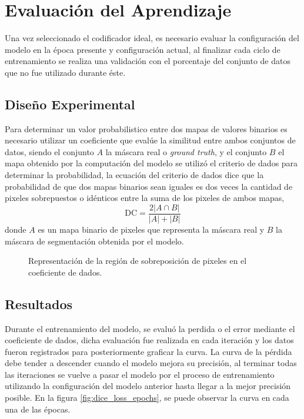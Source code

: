 \clearpage

\section{Evaluación del Aprendizaje}
Una vez seleccionado el codificador ideal, es necesario evaluar la configuración del modelo en la época presente y configuración actual, al finalizar cada ciclo de entrenamiento se realiza una validación con el porcentaje del conjunto de datos que no fue utilizado durante éste.
\subsection{Diseño Experimental}
Para determinar un valor probabilistico entre dos mapas de valores binarios es necesario utilizar un coeficiente que evalúe la similitud entre ambos conjuntos de datos, siendo el conjunto $A$ la máscara real o \emph{ground truth}, y el conjunto $B$ el mapa obtenido por la computación del modelo se utilizó el criterio de dados para determinar la probabilidad, la ecuación del criterio de dados dice que la probabilidad de que dos mapas binarios sean iguales es dos veces la cantidad de pixeles sobrepuestos o idénticos entre la suma de los pixeles de ambos mapas, 
\begin{equation}\label{eq:diceloss}
    \text{DC} = \frac{2|A \cap B |}{|A| + |B|}
\end{equation}
donde $A$ es un mapa binario de pixeles que representa la máscara real y $B$ la máscara de segmentación obtenida por el modelo.

\def\firstcircle{(0,0) circle (1.5cm)}
\def\secondcircle{(2,0) circle (1.5cm)}
\def\thirdcircle{(0:2cm) circle (1.5cm)}

\begin{figure}[!h]
    \centering
    \caption{Representación de la región de sobreposición de pixeles en el coeficiente de dados.}
\end{figure}

\subsection{Resultados}
Durante el entrenamiento del modelo, se evaluó la perdida o el error mediante el coeficiente de dados, dicha evaluación fue realizada en cada iteración y los datos fueron registrados para posteriormente graficar la curva. La curva de la pérdida debe tender a descender cuando el modelo mejora su precisión, al terminar todas las iteraciones se vuelve a pasar el modelo por el proceso de entrenamiento utilizando la configuración del modelo anterior hasta llegar a la mejor precisión posible. En la figura \ref{fig:dice_loss_epochs}, se puede observar la curva en cada una de las épocas.


